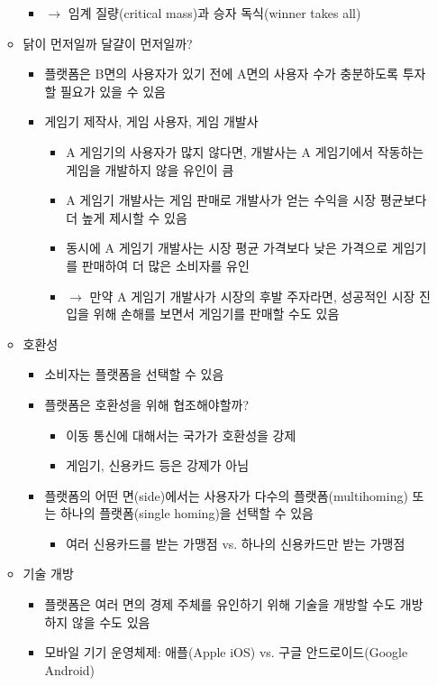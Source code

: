 \begin{itemize}
\begin{itemize}
\begin{itemize}
		\item $\rightarrow$ 임계 질량(critical mass)과 승자 독식(winner takes all)
		\end{itemize}	
	\item 닭이 먼저일까 달걀이 먼저일까?
		\begin{itemize}
		\item 플랫폼은 B면의 사용자가 있기 전에 A면의 사용자 수가 충분하도록 투자할 필요가 있을 수 있음
		\item 게임기 제작사, 게임 사용자, 게임 개발사
			\begin{itemize}
			\item A 게임기의 사용자가 많지 않다면, 개발사는 A 게임기에서 작동하는 게임을 개발하지 않을 유인이 큼
			\item A 게임기 개발사는 게임 판매로 개발사가 얻는 수익을 시장 평균보다 더 높게 제시할 수 있음
			\item 동시에 A 게임기 개발사는 시장 평균 가격보다 낮은 가격으로 게임기를 판매하여 더 많은 소비자를 유인
			\item $\rightarrow$ 만약 A 게임기 개발사가 시장의 후발 주자라면, 성공적인 시장 진입을 위해 손해를 보면서 게임기를 판매할 수도 있음
			\end{itemize}
		\end{itemize}
	\item 호환성
		\begin{itemize}
		\item 소비자는 플랫폼을 선택할 수 있음 
		\item 플랫폼은 호환성을 위해 협조해야할까?
			\begin{itemize}
			\item 이동 통신에 대해서는 국가가 호환성을 강제
			\item 게임기, 신용카드 등은 강제가 아님
			\end{itemize}
		\item 플랫폼의 어떤 면(side)에서는 사용자가 다수의 플랫폼(multihoming) 또는 하나의 플랫폼(single homing)을 선택할 수 있음
			\begin{itemize}
			\item 여러 신용카드를 받는 가맹점 vs. 하나의 신용카드만 받는 가맹점
			\end{itemize}
		\end{itemize}
	\item 기술 개방
		\begin{itemize}
		\item 플랫폼은 여러 면의 경제 주체를 유인하기 위해 기술을 개방할 수도 개방하지 않을 수도 있음
		\item 모바일 기기 운영체제: 애플(Apple iOS) vs. 구글 안드로이드(Google Android)
		\end{itemize}
	\end{itemize}
\end{itemize}

